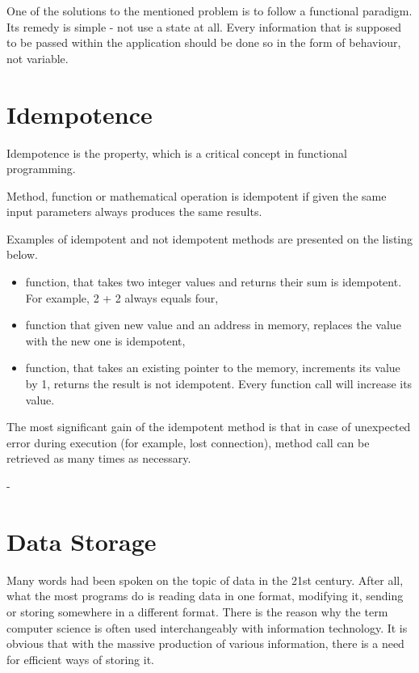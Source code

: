 One of the solutions to the mentioned problem is to follow a functional paradigm. Its remedy is simple - not use a state at all. Every information that is supposed to be passed within the application should be done so in the form of behaviour, not variable.


\section{Idempotence}
\label{idempotence}

Idempotence is the property, which is a critical concept in functional programming. 

Method, function or mathematical operation is idempotent if given the same input parameters always produces the same results. 

Examples of idempotent and not idempotent methods are presented on the listing below.
\begin{itemize}
\item function, that takes two integer values and returns their sum is idempotent. For example, 2 + 2 always equals four, 
\item function that given new value and an address in memory, replaces the value with the new one is idempotent,
\item function, that takes an existing pointer to the memory, increments its value by 1, returns the result is not idempotent. Every function call will increase its value.
\end{itemize}

The most significant gain of the idempotent method is that in case of unexpected error during execution (for example, lost connection), method call can be retrieved as many times as necessary. 


-
\section{Data Storage}
\label{subsecdataStorage}
Many words had been spoken on the topic of data in the 21st century. After all, what the most programs do is reading data in one format, modifying it, sending or storing somewhere in a different format. There is the reason why the term computer science is often used interchangeably with information technology. It is obvious that with the massive production of various information, there is a need for efficient ways of storing it. 


